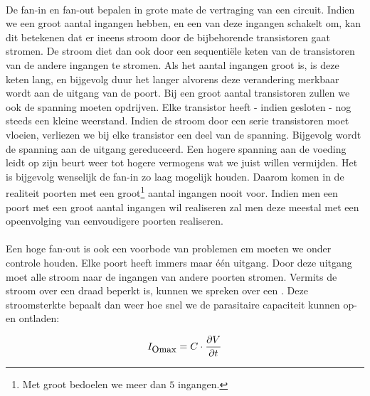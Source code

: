 \paragraph{}
De fan-in en fan-out bepalen in grote mate de vertraging van een circuit. Indien we een groot aantal ingangen hebben, en een van deze ingangen schakelt om, kan dit betekenen dat er ineens stroom door de bijbehorende transistoren gaat stromen. De stroom diet dan ook door een sequenti\"ele keten van de transistoren van de andere ingangen te stromen. Als het aantal ingangen groot is, is deze keten lang, en bijgevolg duur het langer alvorens deze verandering merkbaar wordt aan de uitgang van de poort. Bij een groot aantal transistoren zullen we ook de spanning moeten opdrijven. Elke transistor heeft - indien gesloten - nog steeds een kleine weerstand. Indien de stroom door een serie transistoren moet vloeien, verliezen we bij elke transistor een deel van de spanning. Bijgevolg wordt de spanning aan de uitgang gereduceerd. Een hogere spanning aan de voeding leidt op zijn beurt weer tot hogere vermogens wat we juist willen vermijden. Het is bijgevolg wenselijk de fan-in zo laag mogelijk houden. Daarom komen in de realiteit poorten met een groot\footnote{Met groot bedoelen we meer dan $5$ ingangen.} aantal ingangen nooit voor. Indien men een poort met een groot aantal ingangen wil realiseren zal men deze meestal met een opeenvolging van eenvoudigere poorten realiseren.

\paragraph{}
Een hoge fan-out is ook een voorbode van problemen em moeten we onder controle houden. Elke poort heeft immers maar \'e\'en uitgang. Door deze uitgang moet alle stroom naar de ingangen van andere poorten stromen. Vermits de stroom over een draad beperkt is, kunnen we spreken over een . Deze stroomsterkte bepaalt dan weer hoe snel we de parasitaire capaciteit kunnen op- en ontladen:

\begin{equation}
I_{\mbox{\small{Omax}}}=C\cdot\displaystyle\frac{\partial V}{\partial t}
\end{equation}

